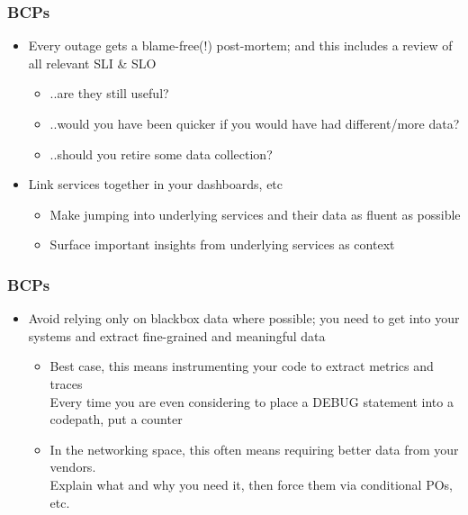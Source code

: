 \documentclass[t]{beamer}
\begin{document}

\begin{frame}
	\frametitle{BCPs}
	\begin{itemize}
		\item Every outage gets a blame-free(!) post-mortem; and this includes a review of all relevant SLI \& SLO
		\begin{itemize}
			\item ..are they still useful?
			\item ..would you have been quicker if you would have had different/more data?
			\item ..should you retire some data collection?
		\end{itemize}
		\item Link services together in your dashboards, etc
		\begin{itemize}
			\item Make jumping into underlying services and their data as fluent as possible
			\item Surface important insights from underlying services as context
		\end{itemize}
	\end{itemize}
\end{frame}

\begin{frame}
	\frametitle{BCPs}
	\begin{itemize}
		\item Avoid relying only on blackbox data where possible; you need to get into your systems and extract fine-grained and meaningful data
		\begin{itemize}
			\item Best case, this means instrumenting your code to extract metrics and traces\\
				Every time you are even considering to place a DEBUG statement into a codepath, put a counter
			\item In the networking space, this often means requiring better data from your vendors.\\
				Explain what and why you need it, then force them via conditional POs, etc.
		\end{itemize}
	\end{itemize}
\end{frame}
\end{document}
